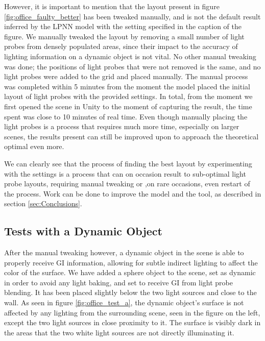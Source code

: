 However, it is important to mention that the layout present in figure \ref{fig:office_faulty_better} has been tweaked manually, and is not the default result inferred by the LPNN model with the setting specified in the caption of the figure. We manually tweaked the layout by removing a small number of light probes from densely populated areas, since their impact to the accuracy of lighting information on a dynamic object is not vital. No other manual tweaking was done; the positions of light probes that were not removed is the same, and no light probes were added to the grid and placed manually. The manual process was completed within 5 minutes from the moment the model placed the initial layout of light probes with the provided settings. In total, from the moment we first opened the scene in Unity to the moment of capturing the result, the time spent was close to 10 minutes of real time. Even though manually placing the light probes is a process that requires much more time, especially on larger scenes, the results present can still be improved upon to approach the theoretical optimal even more.

We can clearly see that the process of finding the best layout by experimenting with the settings is a process that can on occasion result to sub-optimal light probe layouts, requiring manual tweaking or ,on rare occasions, even restart of the process. Work can be done to improve the model and the tool, as described in section \ref{sec:Conclusions}.\newline

\subsection*{Tests with a Dynamic Object}
After the manual tweaking however, a dynamic object in the scene is able to properly receive GI information, allowing for subtle indirect lighting to affect the color of the surface. We have added a sphere object to the scene, set as dynamic in order to avoid any light baking, and set to receive GI from light probe blending. It has been placed slightly below the two light sources and close to the wall. As seen in figure \ref{fig:office_test_a}, the dynamic object's surface is not affected by any lighting from the surrounding scene, seen in the figure on the left, except the two light sources in close proximity to it. The surface is visibly dark in the areas that the two white light sources are not directly illuminating it.


